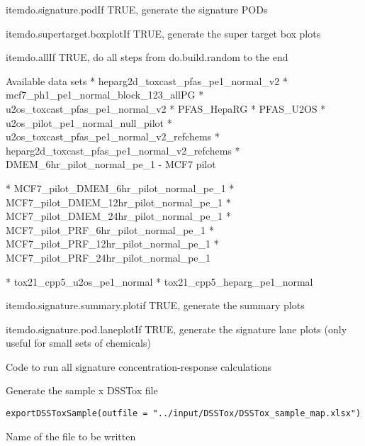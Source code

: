 \documentclass[letterpaper]{book}
\begin{document}
\begin{Arguments}
\begin{ldescription}
\bsl{}itemdo.signature.podIf TRUE, generate the signature PODs

\bsl{}itemdo.supertarget.boxplotIf TRUE, generate the super target box plots

\bsl{}itemdo.allIf TRUE, do all steps from do.build.random to the end


Available data sets
* heparg2d\_toxcast\_pfas\_pe1\_normal\_v2
* mcf7\_ph1\_pe1\_normal\_block\_123\_allPG
* u2os\_toxcast\_pfas\_pe1\_normal\_v2
* PFAS\_HepaRG
* PFAS\_U2OS
* u2os\_pilot\_pe1\_normal\_null\_pilot
* u2os\_toxcast\_pfas\_pe1\_normal\_v2\_refchems
* heparg2d\_toxcast\_pfas\_pe1\_normal\_v2\_refchems
* DMEM\_6hr\_pilot\_normal\_pe\_1 - MCF7 pilot

* MCF7\_pilot\_DMEM\_6hr\_pilot\_normal\_pe\_1
* MCF7\_pilot\_DMEM\_12hr\_pilot\_normal\_pe\_1
* MCF7\_pilot\_DMEM\_24hr\_pilot\_normal\_pe\_1
* MCF7\_pilot\_PRF\_6hr\_pilot\_normal\_pe\_1
* MCF7\_pilot\_PRF\_12hr\_pilot\_normal\_pe\_1
* MCF7\_pilot\_PRF\_24hr\_pilot\_normal\_pe\_1

* tox21\_cpp5\_u2os\_pe1\_normal
* tox21\_cpp5\_heparg\_pe1\_normal

\bsl{}itemdo.signature.summary.plotif TRUE, generate the summary plots

\bsl{}itemdo.signature.pod.laneplotIf TRUE, generate the signature lane plots (only useful for small sets of chemicals)


Code to run all signature concentration-response calculations

\end{ldescription}
\end{Arguments}
%
\begin{Description}\relax
Generate the sample x DSSTox file
\end{Description}
%
\begin{Usage}
\begin{verbatim}
exportDSSToxSample(outfile = "../input/DSSTox/DSSTox_sample_map.xlsx")
\end{verbatim}
\end{Usage}
%
\begin{Arguments}
\begin{ldescription}
\item[\code{outfile}] Name of the file to be written
\end{ldescription}
\end{Arguments}
\end{document}
